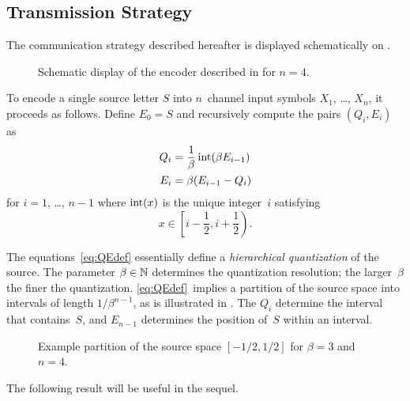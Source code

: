 \subsection{Transmission Strategy}\label{sec:commscheme}

The communication strategy described hereafter is displayed schematically on
.
\begin{figure}
  \begin{center}
    
  \end{center}
  \caption{Schematic display of the encoder described in  for
  $n = 4$.}
  \label{fig:1nencoding}
\end{figure}
To encode a single source letter $S$ into $n$~channel input symbols $X_1$,
\dots, $X_n$, it proceeds as follows. Define $E_0 = S$ and recursively compute
the pairs $(Q_i, E_i)$ as
\begin{subequations}\label{eq:QEdef}
\begin{align}
  Q_i &= \frac{1}{\beta}\operatorname{int}(\beta E_{i-1}) \label{eq:QEdefA} \\
  E_i &= \beta (E_{i-1} - Q_i) \label{eq:QEdefB}
\end{align}
\end{subequations}
for $i = 1$, \dots, $n-1$ where $\operatorname{int}(x)$ is the unique integer~$i$ satisfying
\begin{equation*}
  x \in \left[i - \frac12, i +\frac12\right).
\end{equation*}

The equations~\ref{eq:QEdef} essentially define a \emph{hierarchical
quantization} of the source.  The parameter $\beta \in {\mathbb{N}}$ determines the
quantization resolution; the larger~$\beta$ the finer the quantization.
\eqref{eq:QEdef}~implies a partition of the source space into intervals of
length $1/\beta^{n-1}$, as is illustrated in . The $Q_i$
determine the interval that contains~$S$, and $E_{n-1}$ determines the position
of~$S$ within an interval. 

\begin{figure}
  \begin{center}
    
  \end{center}
  \caption{Example partition of the source space $[-1/2,1/2]$ for $\beta = 3$
  and $n = 4$. }
  \label{fig:sourcepartition}
\end{figure}


The following result will be useful in the sequel.

